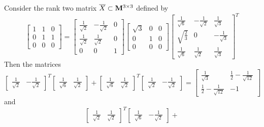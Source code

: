 \documentclass[smallextended,numbook]{svjour3}
\begin{document}
\begin{exa}
{\rm
Consider the rank two matrix $\overline{X}\subset {\bf M}^{3\times 3}$ defined by
\[\left[ \begin{array}{ccc}
1 & 1 &0 \\
0 & 1 & 1 \\
0 & 0 & 0
\end{array} \right] =  \left[ \begin{array}{ccc}
\frac{1}{\sqrt{2}} & -\frac{1}{\sqrt{2}} &0 \\
\frac{1}{\sqrt{2}} & \frac{1}{\sqrt{2}} & 0 \\
0 & 0 & 1
\end{array} \right]
\left[ \begin{array}{ccc}
\sqrt{3} & 0 &0 \\
0 & 1 & 0 \\
0 & 0 & 0
\end{array} \right]
\left[ \begin{array}{ccc}
\frac{1}{\sqrt{6}} & -\frac{1}{\sqrt{2}} & \frac{1}{\sqrt{3}} \\
\sqrt{\frac{2}{3}} & 0 & -\frac{1}{\sqrt{3}} \\
\frac{1}{\sqrt{6}} & \frac{1}{\sqrt{2}} & \frac{1}{\sqrt{3}}
\end{array} \right]^T
\] 
Then the matrices 
\[\left[ \begin{array}{cc}
\frac{1}{\sqrt{2}} & -\frac{1}{\sqrt{2}}
\end{array} \right]^T \left[ \begin{array}{cc}
\frac{1}{\sqrt{6}} & \frac{1}{\sqrt{2}}
\end{array} \right]+
\left[ \begin{array}{cc}
\frac{1}{\sqrt{6}} & \frac{1}{\sqrt{2}}
\end{array} \right]^T
\left[ \begin{array}{cc}
\frac{1}{\sqrt{2}} & -\frac{1}{\sqrt{2}}
\end{array} \right]= \left[ \begin{array}{cc}
\frac{1}{\sqrt{3}} & \frac{1}{2}-\frac{1}{\sqrt{12}}  \\
\frac{1}{2}-\frac{1}{\sqrt{12}}  & -1
\end{array} \right]
\]
and 
\[\left[ \begin{array}{cc}
\frac{1}{\sqrt{2}} & \frac{1}{\sqrt{2}}
\end{array} \right]^T \left[ \begin{array}{cc}
\frac{1}{\sqrt{6}} & -\frac{1}{\sqrt{2}}
\end{array} \right]+
\]}
\end{exa}
\end{document}
